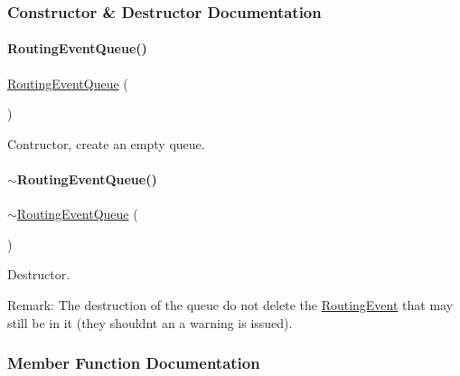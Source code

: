 \subsubsection{Constructor \& Destructor Documentation}
\mbox{\label{classKite_1_1RoutingEventQueue_a67dd3abe4f9f4f32e91dfaa9573976ca}} 
\paragraph{\texorpdfstring{Routing\+Event\+Queue()}{RoutingEventQueue()}}
{\footnotesize\ttfamily \hyperlink{classKite_1_1RoutingEventQueue}{Routing\+Event\+Queue} (\begin{DoxyParamCaption}{ }\end{DoxyParamCaption})}

Contructor, create an empty queue. \mbox{\label{classKite_1_1RoutingEventQueue_a28ed9894863ae1029f16744a86d4bfab}} 
\paragraph{\texorpdfstring{$\sim$\+Routing\+Event\+Queue()}{~RoutingEventQueue()}}
{\footnotesize\ttfamily $\sim$\hyperlink{classKite_1_1RoutingEventQueue}{Routing\+Event\+Queue} (\begin{DoxyParamCaption}{ }\end{DoxyParamCaption})}

Destructor.

\begin{DoxyParagraph}{Remark\+:}
The destruction of the queue do not delete the \hyperlink{classKite_1_1RoutingEvent}{Routing\+Event} that may still be in it (they shouldn\textquotesingle{}t an a warning is issued). 
\end{DoxyParagraph}


\subsubsection{Member Function Documentation}
\mbox{\label{classKite_1_1RoutingEventQueue_a644718bb2fb240de962dc3c9a1fdf0dc}} 
